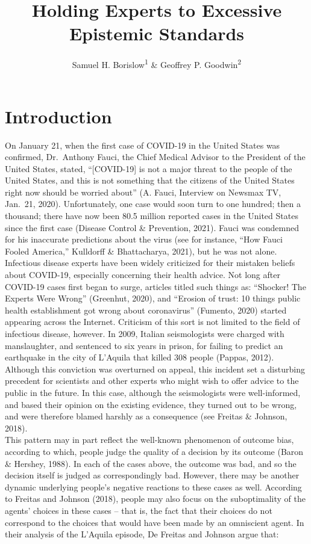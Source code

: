 \documentclass[
  man, donotrepeattitle,floatsintext]{apa6}
\title{Holding Experts to Excessive Epistemic Standards}
\author{Samuel H. Borislow\textsuperscript{1} \& Geoffrey P. Goodwin\textsuperscript{2}}
\date{}
\affiliation{\vspace{0.5cm}\textsuperscript{1} University of Chicago\\\textsuperscript{2} University of Pennsylvania}
\begin{document}
\maketitle

\setlength{\skip\footins}{18pt}

\hypertarget{introduction}{%
\section{Introduction}\label{introduction}}

On January 21, when the first case of COVID-19 in the United States was confirmed, Dr.~Anthony Fauci, the Chief Medical Advisor to the President of the United States, stated, ``{[}COVID-19{]} is not a major threat to the people of the United States, and this is not something that the citizens of the United States right now should be worried about'' (A. Fauci, Interview on Newsmax TV, Jan.~21, 2020). Unfortunately, one case would soon turn to one hundred; then a thousand; there have now been 80.5 million reported cases in the United States since the first case (Disease Control \& Prevention, 2021). Fauci was condemned for his inaccurate predictions about the virus (see for instance, ``How Fauci Fooled America,'' Kulldorff \& Bhattacharya, 2021), but he was not alone. Infectious disease experts have been widely criticized for their mistaken beliefs about COVID-19, especially concerning their health advice. Not long after COVID-19 cases first began to surge, articles titled such things as: ``Shocker! The Experts Were Wrong'' (Greenhut, 2020), and ``Erosion of trust: 10 things public health establishment got wrong about coronavirus'' (Fumento, 2020) started appearing across the Internet. Criticism of this sort is not limited to the field of infectious disease, however. In 2009, Italian seismologists were charged with manslaughter, and sentenced to six years in prison, for failing to predict an earthquake in the city of L'Aquila that killed 308 people (Pappas, 2012). Although this conviction was overturned on appeal, this incident set a disturbing precedent for scientists and other experts who might wish to offer advice to the public in the future. In this case, although the seismologists were well-informed, and based their opinion on the existing evidence, they turned out to be wrong, and were therefore blamed harshly as a consequence (see Freitas \& Johnson, 2018).\\
This pattern may in part reflect the well-known phenomenon of outcome bias, according to which, people judge the quality of a decision by its outcome (Baron \& Hershey, 1988). In each of the cases above, the outcome was bad, and so the decision itself is judged as correspondingly bad. However, there may be another dynamic underlying people's negative reactions to these cases as well. According to Freitas and Johnson (2018), people may also focus on the suboptimality of the agents' choices in these cases -- that is, the fact that their choices do not correspond to the choices that would have been made by an omniscient agent. In their analysis of the L'Aquila episode, De Freitas and Johnson argue that:\\
\end{document}
